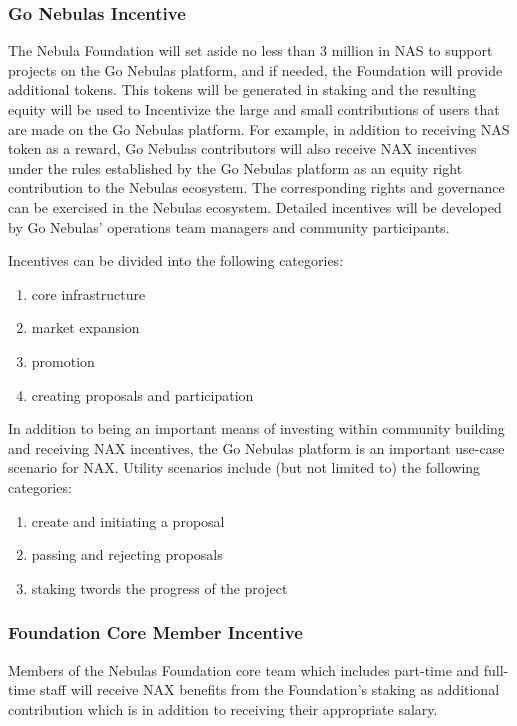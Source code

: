 \subsubsection{Go Nebulas Incentive}
The Nebula Foundation will set aside no less than $3$ million in NAS to support projects on the Go Nebulas platform, and if needed, the Foundation will provide additional tokens. This tokens will be generated in staking and the resulting equity will be used to Incentivize the large and small contributions of users that are made on the Go Nebulas platform. For example, in addition to receiving NAS token as a reward, Go Nebulas contributors will also receive NAX incentives under the rules established by the Go Nebulas platform as an equity right contribution to the Nebulas ecosystem. The corresponding rights and governance can be exercised in the Nebulas ecosystem. Detailed incentives will be developed by Go Nebulas' operations team managers and community participants.

Incentives can be divided into the following categories:
\begin{enumerate}[\hspace{1cm}(a)]
	\item core infrastructure
	\item market expansion
	\item promotion
	\item creating proposals and participation
\end{enumerate}

In addition to being an important means of investing within community building and receiving NAX incentives, the Go Nebulas platform is an important use-case scenario for NAX. Utility scenarios include (but not limited to) the following categories:
\begin{enumerate}[\hspace{1cm}(a)]
	\item create and initiating a proposal
	\item passing and rejecting proposals
	\item staking twords the progress of the project
\end{enumerate}

\subsubsection{Foundation Core Member Incentive}
Members of the Nebulas Foundation core team which includes part-time and full-time staff will receive NAX benefits from the Foundation's staking as additional contribution which is in addition to receiving their appropriate salary.

